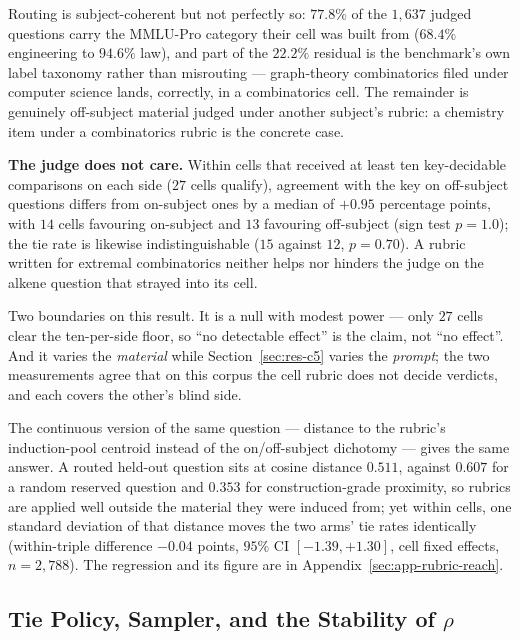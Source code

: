 Routing is subject-coherent but not perfectly so:
$77.8\%$ of the $1{,}637$ judged questions carry the MMLU-Pro category
their cell was built from ($68.4\%$ engineering to $94.6\%$ law), and
part of the $22.2\%$ residual is the benchmark's own label taxonomy
rather than misrouting --- graph-theory combinatorics filed under
computer science lands, correctly, in a combinatorics cell. The
remainder is genuinely off-subject material judged under another
subject's rubric: a chemistry item under a combinatorics rubric is the
concrete case.

\textbf{The judge does not care.} Within cells that received at least ten key-decidable
comparisons on each side ($27$ cells qualify), agreement with the key
on off-subject questions differs from on-subject ones by a median of
$+0.95$ percentage points, with $14$ cells favouring on-subject and
$13$ favouring off-subject (sign test $p = 1.0$); the tie rate is
likewise indistinguishable ($15$ against $12$, $p = 0.70$). A rubric
written for extremal combinatorics neither helps nor hinders the judge
on the alkene question that strayed into its cell.

Two boundaries on this result. It is a null with modest power --- only
$27$ cells clear the ten-per-side floor, so ``no detectable effect''
is the claim, not ``no effect''. And it varies the \emph{material}
while Section~\ref{sec:res-c5} varies the \emph{prompt}; the two
measurements agree that on this corpus the cell rubric does not decide
verdicts, and each covers the other's blind side.

The continuous version of the same question --- distance to the
rubric's induction-pool centroid instead of the on/off-subject
dichotomy --- gives the same answer. A routed held-out question sits
at cosine distance $0.511$, against $0.607$ for a random reserved
question and $0.353$ for construction-grade proximity, so rubrics are
applied well outside the material they were induced from; yet within
cells, one standard deviation of that distance moves the two arms'
tie rates identically (within-triple difference $-0.04$ points,
$95\%$ CI $[-1.39, +1.30]$, cell fixed effects, $n = 2{,}788$). The
regression and its figure are in
Appendix~\ref{sec:app-rubric-reach}.

\subsection{Tie Policy, Sampler, and the Stability of \texorpdfstring{$\rho$}{rho}}\label{sec:res-tie-policy}

